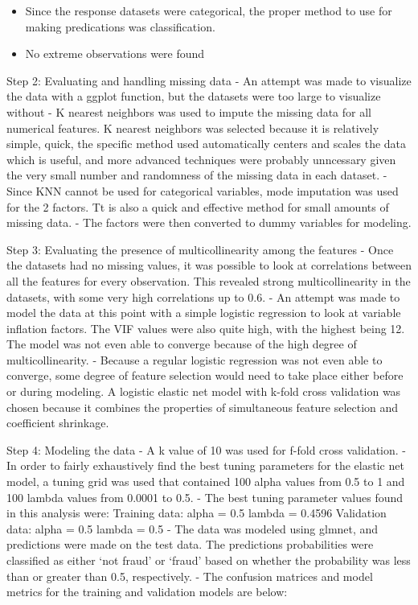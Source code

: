 \documentclass[
]{article}
\providecommand{\tightlist}{%
  \setlength{\itemsep}{0pt}\setlength{\parskip}{0pt}}
\begin{document}
\begin{itemize}
  \begin{itemize}
  \tightlist
  \item
    Since the response datasets were categorical, the proper method to
    use for making predications was classification.
  \item
    No extreme observations were found
  \end{itemize}
\end{itemize}

Step 2: Evaluating and handling missing data - An attempt was made to
visualize the data with a ggplot function, but the datasets were too
large to visualize without - K nearest neighbors was used to impute the
missing data for all numerical features. K nearest neighbors was
selected because it is relatively simple, quick, the specific method
used automatically centers and scales the data which is useful, and more
advanced techniques were probably unncessary given the very small number
and randomness of the missing data in each dataset. - Since KNN cannot
be used for categorical variables, mode imputation was used for the 2
factors. Tt is also a quick and effective method for small amounts of
missing data. - The factors were then converted to dummy variables for
modeling.

Step 3: Evaluating the presence of multicollinearity among the features
- Once the datasets had no missing values, it was possible to look at
correlations between all the features for every observation. This
revealed strong multicollinearity in the datasets, with some very high
correlations up to 0.6. - An attempt was made to model the data at this
point with a simple logistic regression to look at variable inflation
factors. The VIF values were also quite high, with the highest being 12.
The model was not even able to converge because of the high degree of
multicollinearity. - Because a regular logistic regression was not even
able to converge, some degree of feature selection would need to take
place either before or during modeling. A logistic elastic net model
with k-fold cross validation was chosen because it combines the
properties of simultaneous feature selection and coefficient shrinkage.

Step 4: Modeling the data - A k value of 10 was used for f-fold cross
validation. - In order to fairly exhaustively find the best tuning
parameters for the elastic net model, a tuning grid was used that
contained 100 alpha values from 0.5 to 1 and 100 lambda values from
0.0001 to 0.5. - The best tuning parameter values found in this analysis
were: Training data: alpha = 0.5 lambda = 0.4596 Validation data: alpha
= 0.5 lambda = 0.5 - The data was modeled using glmnet, and predictions
were made on the test data. The predictions probabilities were
classified as either `not fraud' or `fraud' based on whether the
probability was less than or greater than 0.5, respectively. - The
confusion matrices and model metrics for the training and validation
models are below:
\end{document}
